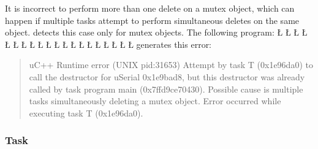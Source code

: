 \documentclass[openright,twoside]{report}
\begin{document}
It is incorrect to perform more than one delete on a mutex object, which can happen if multiple tasks attempt to perform simultaneous deletes on the same object.
\uC detects this case only for mutex objects.
The following program:
\LGinlinefalse\LGbegin\lgrinde
\L{}
\L{\LB{}}
\L{}
\L{\LB{}}
\L{\LB{}}
\CE{}\L{\LB{}}
\L{\LB{\};}}
\endlgrinde\LGend
\LGinlinefalse\LGbegin\lgrinde
\L{}
\L{\LB{}}
\L{\LB{}}
\L{\LB{}}
\CE{}\L{\LB{}}
\L{}
\L{\LB{}}
\L{\LB{\};}}
\endlgrinde\LGend
\LGinlinefalse\LGbegin\lgrinde
\L{}
\L{\LB{}}
\CE{}\L{\LB{}}
\CE{}\L{\LB{}}
\CE{}\L{\LB{\}}}
\endlgrinde\LGend
generates this error:
\begin{quote}
\BGfont
uC++ Runtime error (UNIX pid:31653) Attempt by task T (0x1e96da0) to call the destructor for uSerial 0x1e9bad8, but this destructor was already called by task program main (0x7ffd9ce70430).
Possible cause is multiple tasks simultaneously deleting a mutex object.
Error occurred while executing task T (0x1e96da0).
\end{quote}


\subsubsection{Task}
\end{document}
